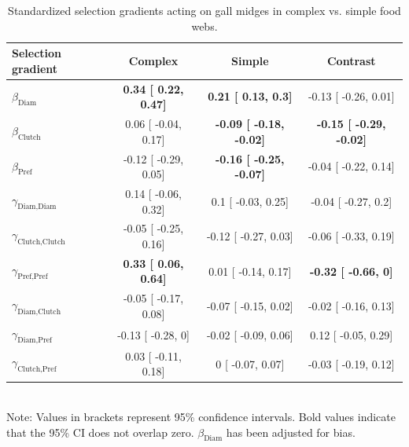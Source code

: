 \documentclass[11pt,]{article}
\begin{document}
\bigskip

\begin{table}[h]
\caption{Standardized selection gradients acting on gall midges in complex vs. simple food webs.}
\label{Table:Gradients}
\centering
\begin{tabular}{lccc}
\\ 
\hline
\textbf{Selection gradient} & \textbf{Complex} & \textbf{Simple} & \textbf{Contrast}  \\ 
\hline
$\beta_{\text{Diam}}$ & 
\textbf{
0.34 [
0.22,
0.47] }& 
\textbf{
0.21 [
0.13,
0.3] }& 

-0.13 [
-0.26,
0.01] \\

$\beta_{\text{Clutch}}$ & 
0.06 [
-0.04,
0.17] & 
\textbf{
-0.09 [
-0.18,
-0.02] }& 
\textbf{
-0.15 [
-0.29,
-0.02] }\\

$\beta_{\text{Pref}}$ &
-0.12 [
-0.29,
0.05] & 
\textbf{
-0.16 [
-0.25,
-0.07] }& 

-0.04 [
-0.22,
0.14] \\

$\gamma_{\text{Diam,Diam}}$ &
0.14 [
-0.06,
0.32] & 

0.1 [
-0.03,
0.25] & 

-0.04 [
-0.27,
0.2] \\

$\gamma_{\text{Clutch,Clutch}}$ & 
-0.05 [
-0.25,
0.16] & 

-0.12 [
-0.27,
0.03] & 

-0.06 [
-0.33,
0.19] \\

$\gamma_{\text{Pref,Pref}}$ & 
\textbf{
0.33 [
0.06,
0.64] }& 

0.01 [
-0.14,
0.17] & 
\textbf{
-0.32 [
-0.66,
0] }\\

$\gamma_{\text{Diam,Clutch}}$ & 
-0.05 [
-0.17,
0.08] & 

-0.07 [
-0.15,
0.02] & 

-0.02 [
-0.16,
0.13] \\

$\gamma_{\text{Diam,Pref}}$ & 
-0.13 [
-0.28,
0] & 

-0.02 [
-0.09,
0.06] & 

0.12 [
-0.05,
0.29] \\

$\gamma_{\text{Clutch,Pref}}$ & 
0.03 [
-0.11,
0.18] & 

0 [
-0.07,
0.07] & 

-0.03 [
-0.19,
0.12] \\ 
\hline
\end{tabular}
\bigskip{}
\\
{\footnotesize Note: Values in brackets represent 95\% confidence intervals. Bold values indicate that the 95\% CI does not overlap zero. $\beta_{\text{Diam}}$ has been adjusted for bias.}
\end{table}
\end{document}
